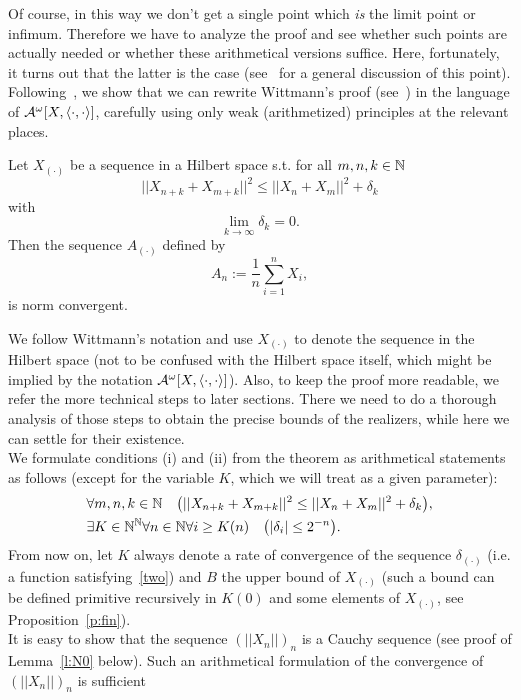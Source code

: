 Of course, in this way we don't get a single point which {\em is} the limit point or infimum. Therefore
we have to analyze the proof and see whether such points are actually needed or whether
these arithmetical versions suffice. Here, fortunately, it turns out that 
the latter is the case (see~\cite{Kohlenbach1998} for a general discussion of this point).\\
Following~\cite{Kohlenbach08}, we show that we can rewrite Wittmann's proof (see~\cite{Wittmann90}) 
in the language of $\mathcal{A}^\omega[X,\langle\cdot,\cdot\rangle]$, carefully using only weak (arithmetized) principles at the relevant places.
\begin{thm}\label{t:fin21ar}
Let $X_{(\cdot)}$ be a sequence in a Hilbert space s.t. for all $m,n,k\in\mathbb{N}$
\[
||X_{n+k} + X_{m+k}||^2 \leq ||X_{n} + X_{m}||^2+\delta_k\tag{i}
\]
with
\[
\lim_{k\to\infty} \delta_{k}=0.\tag{ii}
\]
Then the sequence $A_{(\cdot)}$ defined by
\[
A_n:=\frac{1}{n}\sum^n_{i=1}X_i,
\]
is norm convergent.
\end{thm}
We follow Wittmann's notation and use $X_{(\cdot)}$ to denote the sequence in the
Hilbert space (not to be confused with the Hilbert space itself, which might be implied by the notation $\mathcal{A}^\omega[X,\langle\cdot,\cdot\rangle]$). 
Also, to keep the proof more readable, we refer the more technical steps to later sections. There we need to do 
a thorough analysis of those steps to obtain the precise bounds of the realizers, while here we 
can settle for their existence.\\
We formulate conditions (i) and (ii) from the theorem as arithmetical statements as follows (except for
the variable $K$, which we will treat as a given parameter):
\begin{align}
&\forall m,n,k\in\mathbb{N} \quad \big( ||X_{n+k}+X_{m+k}||^2 \leq ||X_{n}+X_{m}||^2 + \delta_k\big),\label{l:one}\\
&\exists K\in\mathbb{N}^{\mathbb{N}}\forall n\in\mathbb{N} \forall i\geq K(n)\quad \big( |\delta_i|\leq 2^{-n}\big).\label{l:two}
\end{align}
From now on, let $K$ always denote a rate of convergence of the sequence $\delta_{(\cdot)}$ 
(i.e. a function satisfying~\eqref{two}) and $B$ the upper bound of $X_{(\cdot)}$ (such a bound
can be defined primitive recursively in $K(0)$ and some elements of $X_{(\cdot)}$, see Proposition~\ref{p:fin}).\\
It is easy to show that the sequence $(||X_n||)_n$ is a Cauchy sequence 
(see proof of Lemma~\ref{l:N0} below). Such an arithmetical formulation
of the convergence of $(||X_n||)_n$ is sufficient
